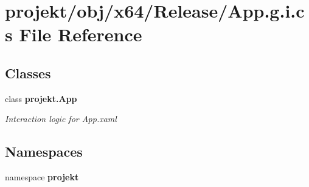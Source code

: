 \section{projekt/obj/x64/\+Release/\+App.g.\+i.\+cs File Reference}
\label{x64_2Release_2App_8g_8i_8cs}
\subsection*{Classes}
\begin{DoxyCompactItemize}
\item 
class \textbf{ projekt.\+App}
\begin{DoxyCompactList}\small\item\em Interaction logic for App.\+xaml \end{DoxyCompactList}\end{DoxyCompactItemize}
\subsection*{Namespaces}
\begin{DoxyCompactItemize}
\item 
namespace \textbf{ projekt}
\end{DoxyCompactItemize}
